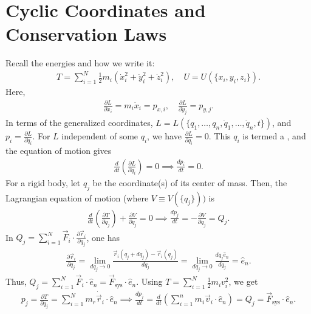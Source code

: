 \section{Cyclic Coordinates and Conservation Laws}
Recall the energies and how we write it:
\begin{align}
    T = \sum_{i=1}^{N} \frac{1}{2}m_{i}(\dot{x}_{i}^{2}+\dot{y}_{i}^{2}+\dot{z}_{i}^{2}),\quad U = U(\{x_{i},y_{i},z_{i}\}).
\end{align}
Here,
\begin{align}
    \frac{\partial L}{\partial \dot{x}_{i}} = m_{i}\dot{x}_{i} = p_{x,i},\quad \frac{\partial L}{\partial \dot{y}_{j}} = p_{y,j}.
\end{align}
In terms of the generalized coordinates, $L = L(\{q_{1},\ldots,q_{n},\dot{q}_{1},\ldots,\dot{q}_{n},t\})$, and $p_{i} = \frac{\partial L}{\partial \dot{q}_{i}}$. For $L$ independent of some $q_{i}$, we have $\frac{\partial L}{\partial q_{i}} = 0$. This $q_{i}$ is termed a , and the equation of motion gives
\begin{align}
    \frac{d}{dt} \left( \frac{\partial L}{\partial \dot{q}_{i}} \right) = 0 \implies \frac{dp_{i}}{dt} = 0.
\end{align}
For a rigid body, let $q_{j}$ be the coordinate(s) of its center of mass. Then, the Lagrangian equation of motion (where $V \equiv V(\{q_{j}\}))$ is
\begin{align}
    \frac{d}{dt}\left( \frac{\partial T}{\partial \dot{q}_{j}} \right) + \frac{\partial V}{\partial q_{j}} = 0 \implies \frac{dp_{j}}{dt} = -\frac{\partial V}{\partial q_{j}} = Q_{j}.
\end{align}
In $Q_{j} = \sum_{i=1}^{N} \vec{F}_{i} \cdot \frac{\partial \vec{r}_{i}}{\partial q_{j}}$, one has
\begin{align}
    \frac{\partial \vec{r}_{i}}{\partial q_{j}} = \lim_{dq_{j} \to 0} \frac{\vec{r}_{i}(q_{j}+dq_{j})-\vec{r}_{i}(q_{j})}{dq_{j}} = \lim_{dq_{j} \to 0} \frac{dq_{j} \hat{e}_{n}}{dq_{j}} = \hat{e}_{n}.
\end{align}
Thus, $Q_{j} = \sum_{i=1}^{N} \vec{F}_{i} \cdot \hat{e}_{n} = \vec{F}_{\text{sys}} \cdot \hat{e}_{n}$. Using $T = \sum_{i=1}^{N} \frac{1}{2} m_{i} v_{i}^{2}$, we get
\begin{align}
    p_{j} = \frac{\partial T}{\partial \dot{q}_{j}} = \sum_{i=1}^{N} m_{r} \dot{\vec{r}}_{i} \cdot \hat{e}_{n} \implies \frac{dp_{j}}{dt} = \frac{d}{dt} \left( \sum_{i=1}^{n} m_{i} \vec{v}_{i} \cdot \hat{e}_{n} \right) = Q_{j} = \vec{F}_{\text{sys}} \cdot \hat{e}_{n}.
\end{align}
